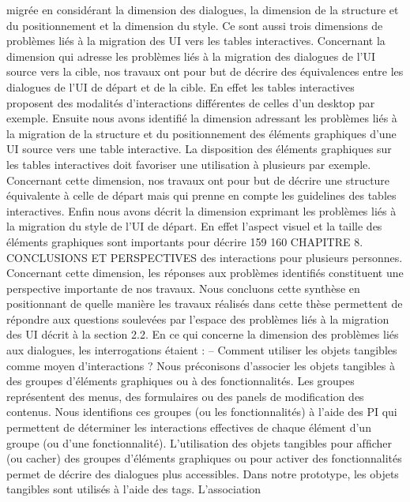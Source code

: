\documentclass{article}
\begin{document}
migr\'{e}e en consid\'{e}rant la dimension des dialogues, la dimension de la structure et du positionnement
et la dimension du style. Ce sont aussi trois dimensions de probl\`{e}mes li\'{e}s \`{a} la migration des UI vers
les tables interactives.
Concernant la dimension qui adresse les probl\`{e}mes li\'{e}s \`{a} la migration des dialogues de l’UI source
vers la cible, nos travaux ont pour but de d\'{e}crire des \'{e}quivalences entre les dialogues de l’UI de d\'{e}part
et de la cible. En effet les tables interactives proposent des modalit\'{e}s d’interactions diff\'{e}rentes de
celles d’un desktop par exemple.
Ensuite nous avons identiﬁ\'{e} la dimension adressant les probl\`{e}mes li\'{e}s \`{a} la migration de la structure et du positionnement des \'{e}l\'{e}ments graphiques d’une UI source vers une table interactive. La
disposition des \'{e}l\'{e}ments graphiques sur les tables interactives doit favoriser une utilisation \`{a} plusieurs
par exemple. Concernant cette dimension, nos travaux ont pour but de d\'{e}crire une structure \'{e}quivalente \`{a} celle de d\'{e}part mais qui prenne en compte les guidelines des tables interactives.
Enﬁn nous avons d\'{e}crit la dimension exprimant les probl\`{e}mes li\'{e}s \`{a} la migration du style de l’UI
de d\'{e}part. En effet l’aspect visuel et la taille des \'{e}l\'{e}ments graphiques sont importants pour d\'{e}crire
159
160
CHAPITRE 8. CONCLUSIONS ET PERSPECTIVES
des interactions pour plusieurs personnes. Concernant cette dimension, les r\'{e}ponses aux probl\`{e}mes
identiﬁ\'{e}s constituent une perspective importante de nos travaux.
Nous concluons cette synth\`{e}se en positionnant de quelle mani\`{e}re les travaux r\'{e}alis\'{e}s dans cette
th\`{e}se permettent de r\'{e}pondre aux questions soulev\'{e}es par l’espace des probl\`{e}mes li\'{e}s \`{a} la migration
des UI d\'{e}crit \`{a} la section 2.2.
En ce qui concerne la dimension des probl\`{e}mes li\'{e}s aux dialogues, les interrogations \'{e}taient :
– Comment utiliser les objets tangibles comme moyen d’interactions ?
Nous pr\'{e}conisons d’associer les objets tangibles \`{a} des groupes d’\'{e}l\'{e}ments graphiques ou \`{a} des
fonctionnalit\'{e}s. Les groupes repr\'{e}sentent des menus, des formulaires ou des panels de modiﬁcation des contenus. Nous identiﬁons ces groupes (ou les fonctionnalit\'{e}s) \`{a} l’aide des PI qui
permettent de d\'{e}terminer les interactions effectives de chaque \'{e}l\'{e}ment d’un groupe (ou d’une
fonctionnalit\'{e}). L’utilisation des objets tangibles pour afﬁcher (ou cacher) des groupes d’\'{e}l\'{e}ments graphiques ou pour activer des fonctionnalit\'{e}s permet de d\'{e}crire des dialogues plus accessibles. Dans notre prototype, les objets tangibles sont utilis\'{e}s \`{a} l’aide des tags. L’association
\end{document}
